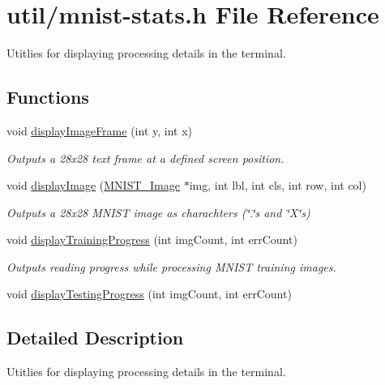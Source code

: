 \hypertarget{mnist-stats_8h}{}\section{util/mnist-\/stats.h File Reference}
\label{mnist-stats_8h}


Utitlies for displaying processing details in the terminal.  


\subsection*{Functions}
\begin{DoxyCompactItemize}
\item 
void \hyperlink{mnist-stats_8h_a9661d063fbb3016f798e34764a2a6b84}{display\+Image\+Frame} (int y, int x)
\begin{DoxyCompactList}\small\item\em Outputs a 28x28 text frame at a defined screen position. \end{DoxyCompactList}\item 
void \hyperlink{mnist-stats_8h_a53dfbeeccdcba8c3c5e707487f7d422e}{display\+Image} (\hyperlink{struct_m_n_i_s_t___image}{M\+N\+I\+S\+T\+\_\+\+Image} $\ast$img, int lbl, int cls, int row, int col)
\begin{DoxyCompactList}\small\item\em Outputs a 28x28 M\+N\+I\+S\+T image as charachters (\char`\"{}.\char`\"{}s and \char`\"{}\+X\char`\"{}s) \end{DoxyCompactList}\item 
void \hyperlink{mnist-stats_8h_ae72b998f2876df0e8b7cfa9501531e6e}{display\+Training\+Progress} (int img\+Count, int err\+Count)
\begin{DoxyCompactList}\small\item\em Outputs reading progress while processing M\+N\+I\+S\+T training images. \end{DoxyCompactList}\item 
void \hyperlink{mnist-stats_8h_a9331d15ac78b41bbed855cb8221168fb}{display\+Testing\+Progress} (int img\+Count, int err\+Count)
\end{DoxyCompactItemize}


\subsection{Detailed Description}
Utitlies for displaying processing details in the terminal. 

